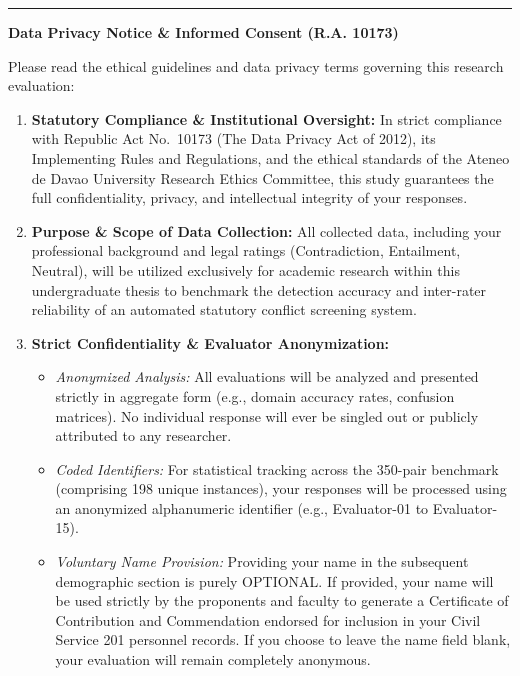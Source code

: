 \vspace{1em}
\hrule
\vspace{1em}

\noindent\textbf{Data Privacy Notice \& Informed Consent (R.A. 10173)}

\noindent Please read the ethical guidelines and data privacy terms governing this research evaluation:

\begin{enumerate}[leftmargin=1.8em, itemsep=4pt]
    \item \textbf{Statutory Compliance \& Institutional Oversight:} In strict compliance with Republic Act No.~10173 (The Data Privacy Act of 2012), its Implementing Rules and Regulations, and the ethical standards of the Ateneo de Davao University Research Ethics Committee, this study guarantees the full confidentiality, privacy, and intellectual integrity of your responses.
    \item \textbf{Purpose \& Scope of Data Collection:} All collected data, including your professional background and legal ratings (Contradiction, Entailment, Neutral), will be utilized exclusively for academic research within this undergraduate thesis to benchmark the detection accuracy and inter-rater reliability of an automated statutory conflict screening system.
    \item \textbf{Strict Confidentiality \& Evaluator Anonymization:}
    \begin{itemize}[leftmargin=1.2em, itemsep=2pt]
        \item \textit{Anonymized Analysis:} All evaluations will be analyzed and presented strictly in aggregate form (e.g., domain accuracy rates, confusion matrices). No individual response will ever be singled out or publicly attributed to any researcher.
        \item \textit{Coded Identifiers:} For statistical tracking across the 350-pair benchmark (comprising 198 unique instances), your responses will be processed using an anonymized alphanumeric identifier (e.g., Evaluator-01 to Evaluator-15).
        \item \textit{Voluntary Name Provision:} Providing your name in the subsequent demographic section is purely OPTIONAL. If provided, your name will be used strictly by the proponents and faculty to generate a Certificate of Contribution and Commendation endorsed for inclusion in your Civil Service 201 personnel records. If you choose to leave the name field blank, your evaluation will remain completely anonymous.
    \end{itemize}

\end{enumerate}
